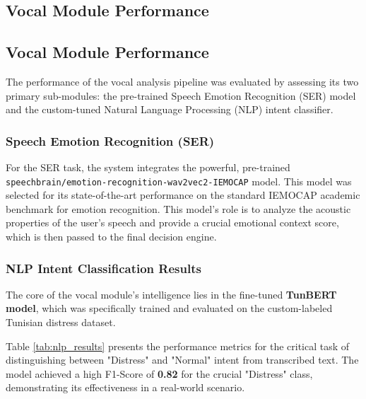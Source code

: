 \documentclass[12pt,a4paper,oneside,english]{book}
\begin{document}
{    \subsection{Vocal Module Performance}
    \label{subsec:vocal_results}

    \subsection{Vocal Module Performance}
\label{subsec:vocal_results}

The performance of the vocal analysis pipeline was evaluated by assessing its two primary sub-modules: the pre-trained Speech Emotion Recognition (SER) model and the custom-tuned Natural Language Processing (NLP) intent classifier.

\subsubsection{Speech Emotion Recognition (SER)}
For the SER task, the system integrates the powerful, pre-trained \texttt{speechbrain/emotion-recognition-wav2vec2-IEMOCAP} model. 
This model was selected for its state-of-the-art performance on the standard IEMOCAP academic benchmark for emotion recognition. 
This model's role is to analyze the acoustic properties of the user's speech and provide a crucial emotional context score, which is then passed to the final decision engine.

\subsubsection{NLP Intent Classification Results}
The core of the vocal module's intelligence lies in the fine-tuned \textbf{TunBERT model}, which was specifically trained and evaluated on the custom-labeled Tunisian distress dataset. 

Table \ref{tab:nlp_results} presents the performance metrics for the critical task of distinguishing between "Distress" and "Normal" intent from transcribed text. The model achieved a high F1-Score of \textbf{0.82} for the crucial "Distress" class, demonstrating its effectiveness in a real-world scenario.

}
\end{document}
